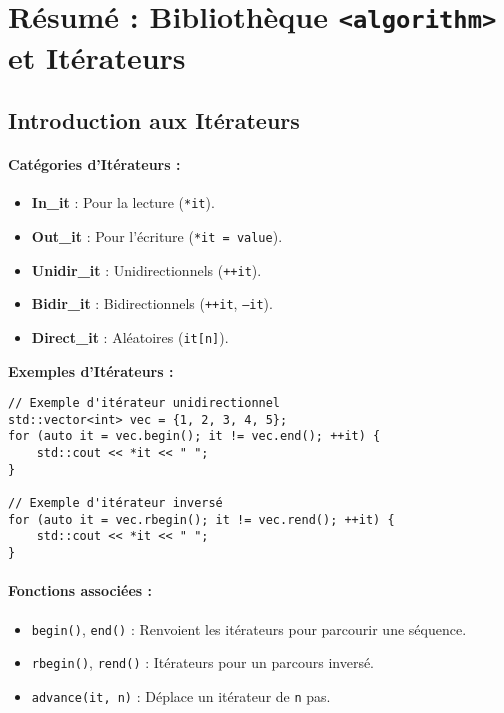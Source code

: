 \section{ Résumé : Bibliothèque \texttt{<algorithm>} et Itérateurs}

\subsection{ Introduction aux Itérateurs}
\paragraph{Catégories d'Itérateurs :}
\begin{itemize}
    \item \textbf{In\_it} : Pour la lecture (\texttt{*it}).
    \item \textbf{Out\_it} : Pour l’écriture (\texttt{*it = value}).
    \item \textbf{Unidir\_it} : Unidirectionnels (\texttt{++it}).
    \item \textbf{Bidir\_it} : Bidirectionnels (\texttt{++it}, \texttt{--it}).
    \item \textbf{Direct\_it} : Aléatoires (\texttt{it[n]}).
\end{itemize}

\textbf{Exemples d'Itérateurs :}
\begin{tcolorbox}[colframe=blue!50!black, colback=blue!5!white, title=Exemples d'Itérateurs]
\begin{verbatim}
// Exemple d'itérateur unidirectionnel
std::vector<int> vec = {1, 2, 3, 4, 5};
for (auto it = vec.begin(); it != vec.end(); ++it) {
    std::cout << *it << " ";
}

// Exemple d'itérateur inversé
for (auto it = vec.rbegin(); it != vec.rend(); ++it) {
    std::cout << *it << " ";
}
\end{verbatim}
\end{tcolorbox}

\paragraph{Fonctions associées :}
\begin{itemize}
    \item \texttt{begin()}, \texttt{end()} : Renvoient les itérateurs pour parcourir une séquence.
    \item \texttt{rbegin()}, \texttt{rend()} : Itérateurs pour un parcours inversé.
    \item \texttt{advance(it, n)} : Déplace un itérateur de \texttt{n} pas.
\end{itemize}

